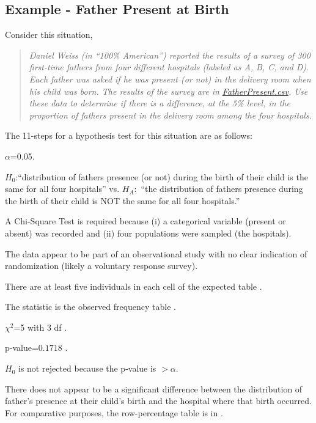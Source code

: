 \documentclass[10pt,openany]{book}\usepackage[]{graphicx}\usepackage[]{color}
\begin{document}
\subsection{Example - Father Present at Birth}
\vspace{-12pt}
Consider this situation,
\begin{quote}
\textsl{Daniel Weiss (in ``100\% American'') reported the results of a survey of 300 first-time fathers from four different hospitals (labeled as A, B, C, and D).  Each father was asked if he was present (or not) in the delivery room when his child was born.  The results of the survey are in \href{https://raw.githubusercontent.com/droglenc/NCData/master/FatherPresent.csv}{FatherPresent.csv}.  Use these data to determine if there is a difference, at the 5\% level, in the proportion of fathers present in the delivery room among the four hospitals.}
\end{quote}



The 11-steps  for a hypothesis test for this situation are as follows:
  \begin{Enumerate}
    \item $\alpha$=0.05.
    \item $H_{0}$:``distribution of fathers presence (or not) during the birth of their child is the same for all four hospitals'' vs. $H_{A}:$ ``the distribution of fathers presence during the birth of their child is NOT the same for all four hospitals.''
    \item A Chi-Square Test is required because (i) a categorical variable (present or absent) was recorded and (ii) four populations were sampled (the hospitals).
    \item The data appear to be part of an observational study with no clear indication of randomization (likely a voluntary response survey).
    \item There are at least five individuals in each cell of the expected table .
    \item The statistic is the observed frequency table .
    \item $\chi^{2}$=5 with 3 df .
    \item p-value=$0.1718$ .
    \item $H_{0}$ is not rejected because the p-value is $>\alpha$.
    \item There does not appear to be a significant difference between the distribution of father's presence at their child's birth and the hospital where that birth occurred.  For comparative purposes, the row-percentage table is in .
  \end{Enumerate}
\end{document}
